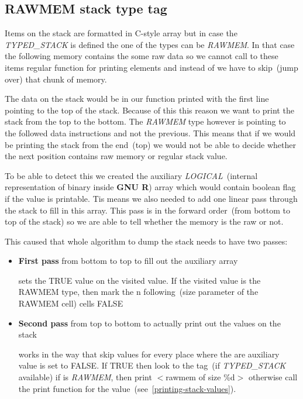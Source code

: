 \documentclass[thesis=M,english]{FITthesis}[2018/10/20]
\begin{document}
\subsection{RAWMEM stack type tag}

Items on the stack are formatted in C-style array but in case the \textit{TYPED{\_}STACK} is defined the one of the types can be \textit{RAWMEM}. In that case the following memory contains the some raw data so we cannot call to these items regular function for printing elements and instead of we have to skip~(jump over) that chunk of memory.

The data on the stack would be in our function printed with the first line pointing to the top of the  stack. Because of this this reason we want to print the stack from the top to the bottom. The \textit{RAWMEM} type however is pointing to the followed data instructions and not the previous. This means that if we would be printing the stack from the end~(top) we would not be able to decide whether the next position contains raw memory or regular stack value.

To be able to detect this we created the auxiliary \textit{LOGICAL}~(internal representation of binary inside \textbf{GNU R}) array which would contain boolean flag if the value is printable. Tis means we also needed to add one linear pass through the stack to fill in this array. This pass is in the forward order~(from bottom to top of the stack) so we are able to tell whether the memory is the raw or not. 

This caused that whole algorithm to dump the stack needs to have two passes:

\begin{itemize}
	\item \textbf{First pass} from bottom to top to fill out the auxiliary array
	
			sets the TRUE value on the visited value. If the visited value is the RAWMEM type, then mark the n following~(size parameter of the RAWMEM cell) cells FALSE

	\item \textbf{Second pass} from top to bottom to actually print out the values on the stack
	
			works in the way that skip values for every place where the are auxiliary value is set to FALSE. If TRUE then look to the tag~(if \textit{TYPED{\_}STACK} available) if is \textit{RAWMEM}, then print $<$rawmem of size \%d$>$ otherwise call the print function for the value~(see~\ref{printing-stack-values}).
\end{itemize}
\end{document}
